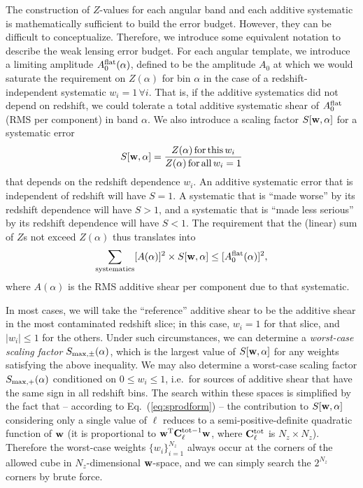 \documentclass[usenatbib]{mnras}
\begin{document}
The construction of $Z$-values for each angular band and each additive
systematic is mathematically sufficient to build the error
budget. However, they can be difficult to conceptualize. Therefore, we
introduce some equivalent notation to describe the weak lensing error
budget. For each angular template, we introduce a limiting amplitude
$A_0^{\rm flat}(\alpha)$, defined to be the amplitude $A_0$ at which
we would saturate the requirement on $Z(\alpha)$ for bin $\alpha$ in
the case of a redshift-independent systematic $w_i=1\,\forall i$. That
is, if the additive systematics did not depend on redshift, we could
tolerate a total additive systematic shear of $A_0^{\rm flat}$ (RMS
per component) in band $\alpha$. We also introduce a scaling factor
$S[{\bf w},\alpha]$ for a systematic error
\begin{equation}
S[{\bf w},\alpha] = \frac{Z(\alpha) \,{\rm for\,this\,}w_i}{Z(\alpha)\,{\rm for\,all\,}w_i=1}
\label{eq:Swa}
\end{equation}
that depends on the redshift dependence $w_i$. An additive systematic error that is independent of redshift will have $S=1$. A systematic that is ``made worse'' by its redshift dependence will have $S>1$, and a systematic that is ``made less serious'' by its redshift dependence will have $S<1$. The requirement that the (linear) sum of $Z$s not exceed $Z(\alpha)$ thus translates into
\begin{equation}
\sum_{\rm systematics} [A(\alpha)]^2\times S[{\bf w},\alpha] \le [A_0^{\rm flat}(\alpha)]^2,
\label{eq:A-S-sum}
\end{equation}
where $A(\alpha)$ is the RMS additive shear per component due to that systematic.

In most cases, we will take the ``reference'' additive shear to be the
additive shear in the most contaminated redshift slice; in this case,
$w_i=1$ for that slice, and $|w_i|\le 1$ for the others. Under such
circumstances, we can determine a {\em worst-case scaling factor}
$S_{\rm max,\pm}(\alpha)$, which is the largest value of $S[{\bf
w},\alpha]$ for any weights satisfying the above inequality. We may
also determine a worst-case scaling factor $S_{\rm max,+}(\alpha)$
conditioned on $0\le w_i\le 1$, i.e.\ for sources of additive shear
that have the same sign in all redshift bins. The search within these
spaces is simplified by the fact that -- according to
Eq.~(\ref{eq:sprodform}) -- the contribution to $S[{\bf w},\alpha]$
considering only a single value of $\ell$ reduces to a
semi-positive-definite quadratic function of ${\bf w}$ (it is proportional to ${\bf w}^{\rm T}{\bf C}_\ell^{{\rm tot}-1}{\bf w}$, where ${\bf C}_\ell^{\rm tot}$ is $N_z\times N_z$). Therefore the
worst-case weights $\{w_i\}_{i=1}^{N_z}$ always occur at the corners
of the allowed cube in $N_z$-dimensional ${\bf w}$-space, and we can
simply search the $2^{N_z}$ corners by brute force.
\end{document}
